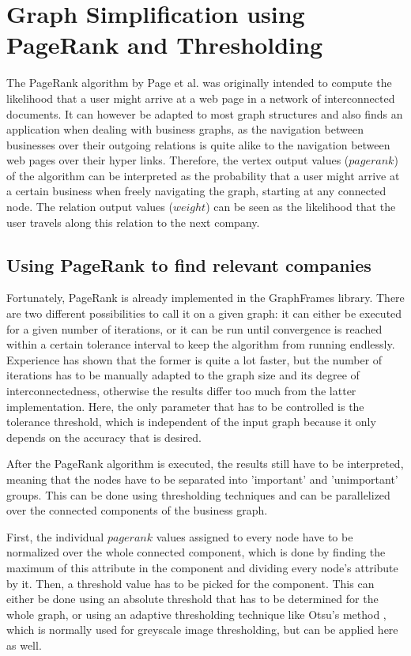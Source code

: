 \documentclass[
        a4paper,     %
        titlepage,   %
        oneside,     %
        parskip      %
        ]{scrartcl}  %
\begin{document}
  \section{Graph Simplification using PageRank and Thresholding}
  The PageRank algorithm by Page et al. \cite{pagerank1999} was originally intended
  to compute the likelihood that a user might arrive at a web page
  in a network of interconnected documents. It can however be adapted to most
  graph structures and also finds an application when dealing with business graphs,
  as the navigation between businesses over their outgoing relations is quite
  alike to the navigation between web pages over their hyper links.
  Therefore, the vertex output values ($pagerank$) of the algorithm can be interpreted as the
  probability that a user might arrive at a certain business when freely
  navigating the graph, starting at any connected node.
  The relation output values ($weight$) can be seen as the likelihood that the user
  travels along this relation to the next company.

  \subsection{Using PageRank to find relevant companies}
  Fortunately, PageRank is already implemented in the GraphFrames library.
  There are two different possibilities to call it on a given graph: it can either
  be executed for a given number of iterations, or it can be run until convergence
  is reached within a certain tolerance interval to keep the algorithm from running endlessly.
  Experience has shown that the former is quite a lot faster, but the number of iterations
  has to be manually adapted to the graph size and its degree of interconnectedness,
  otherwise the results differ too much from the latter implementation.
  Here, the only parameter that has to be controlled is the tolerance threshold,
  which is independent of the input graph because it only depends on the accuracy that is desired.

  After the PageRank algorithm is executed, the results still have to be interpreted,
  meaning that the nodes have to be separated into 'important' and 'unimportant' groups.
  This can be done using thresholding techniques and can be parallelized
  over the connected components of the business graph.

  First, the individual $pagerank$ values assigned to every node have to be normalized
  over the whole connected component, which is done by finding the maximum of this
  attribute in the component and dividing every node's attribute by it.
  Then, a threshold value has to be picked for the component. This can either be done
  using an absolute threshold that has to be determined for the whole graph, or
  using an adaptive thresholding technique like Otsu's method \cite{otsu1979threshold},
  which is normally used for greyscale image thresholding, but can be applied here as well.
\end{document}
